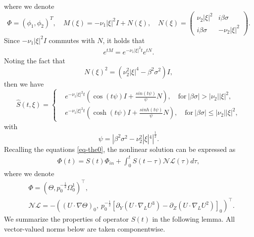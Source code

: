 \documentclass[12pt]{article}
\newtheorem{lemma}{Lemma}[section]
\numberwithin{equation}{section}
\begin{document}
  	where we denote
  	\begin{equation*}
  		\Phi=(\phi_1,\phi_2)^{T},\quad M(\xi)=-\nu_1|\xi|^2I+N(\xi),\quad N(\xi)=\left(\begin{array}{cc}
  		     \nu_2|\xi|^2&i\beta\sigma\\
  		     i\beta\sigma&-\nu_2|\xi|^2
  		\end{array}\right).
  	\end{equation*}
  	Since $-\nu_1|\xi|^2I$ commutes with $N$, it holds that
  	\begin{align*}
  		e^{tM}=e^{-\nu_1|\xi|^2 t}e^{tN}.
  	\end{align*} 
  	Noting the fact that
  	\begin{equation*}
  		N(\xi)^2=(\nu_2^2|\xi|^4-\beta^2\sigma^2)I,
  	\end{equation*}
    then we have 
    \begin{equation}\label{eq-s}
        \hat{S}(t,\xi)=\left\{\begin{aligned}
            &e^{-\nu_1|\xi|^2 t}\left(\cos(t\psi)I+\frac{sin(t\psi)}{\psi}N\right),\quad \mathrm{for}\ |\beta\sigma|>|\nu_2||\xi|^2,\\
            &e^{-\nu_1|\xi|^2 t}\left(\cosh(t\psi)I+\frac{sinh(t\psi)}{\psi}N\right),\quad \mathrm{for}\ |\beta\sigma|\leq|\nu_2||\xi|^2,
        \end{aligned}\right.
    \end{equation}
    with
  	\begin{equation*}
  		\psi=|\beta^2\sigma^2-\nu_2^2|\xi|^4|^{\frac{1}{2}}.
  	\end{equation*}
    Recalling the equations \eqref{eq-the0}, the nonlinear solution can be expressed as 
    \begin{align}
        \varPhi(t)=S(t)\varPhi_{in}+\int_{0}^{t}S(t-\tau)\mathcal{NL}(\tau)d\tau,\label{eq-phi}
    \end{align}
    where we denote
    \begin{align*}
        &\varPhi=(\Theta,p_0^{-\frac{1}{2}}\Omega_0^1)^{\top},\\
        &\mathcal{NL}=-\left((U\cdot\nabla \Theta)_0,\ p_0^{-\frac{1}{2}}[\partial_Y(U\cdot\nabla_LU^3)-\partial_Z(U\cdot\nabla_LU^2)]_0\right)^{\top}.
    \end{align*}
    We summarize the properties of operator $S(t)$ in the following lemma. All vector-valued norms below are taken componentwise.
\end{document}
